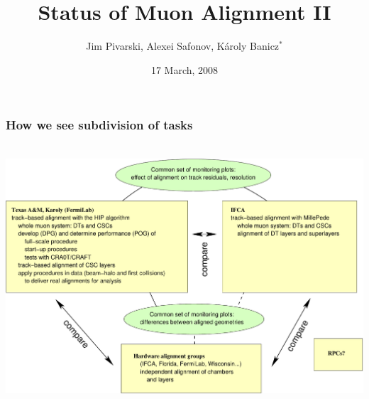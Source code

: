 \documentclass[compress]{beamer}
\title{Status of Muon Alignment II}
\author{Jim Pivarski, Alexei Safonov, K\'aroly Banicz$^*$}
\institute{Texas A\&M University, $^*$FermiLab}
\date{17 March, 2008}
\begin{document}
\frame{\titlepage}


%
%

\begin{frame}
\frametitle{How we see subdivision of tasks}

\vfill
\mbox{\hspace{-0.9 cm} \includegraphics[width=1.15\linewidth]{groups.pdf}}
\end{frame}
\end{document}
